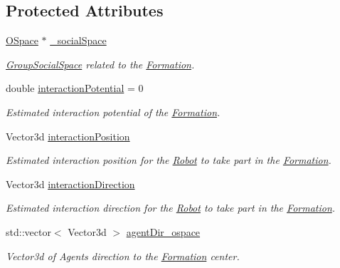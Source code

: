 \subsection*{Protected Attributes}
\begin{DoxyCompactItemize}
\item 
\hyperlink{classOSpace}{O\+Space} $\ast$ \hyperlink{classFormation_a8d69dd518359bf8d1d1b30a5c07db561}{\+\_\+social\+Space}\hypertarget{classFormation_a8d69dd518359bf8d1d1b30a5c07db561}{}\label{classFormation_a8d69dd518359bf8d1d1b30a5c07db561}

\begin{DoxyCompactList}\small\item\em \hyperlink{classGroupSocialSpace}{Group\+Social\+Space} related to the \hyperlink{classFormation}{Formation}. \end{DoxyCompactList}\item 
double \hyperlink{classFormation_afac1af6d51a6b8a910df4574cb7a6931}{interaction\+Potential} = 0\hypertarget{classFormation_afac1af6d51a6b8a910df4574cb7a6931}{}\label{classFormation_afac1af6d51a6b8a910df4574cb7a6931}

\begin{DoxyCompactList}\small\item\em Estimated interaction potential of the \hyperlink{classFormation}{Formation}. \end{DoxyCompactList}\item 
Vector3d \hyperlink{classFormation_a5e33d98c2b9ec916e601ae27d6c7f2ef}{interaction\+Position}\hypertarget{classFormation_a5e33d98c2b9ec916e601ae27d6c7f2ef}{}\label{classFormation_a5e33d98c2b9ec916e601ae27d6c7f2ef}

\begin{DoxyCompactList}\small\item\em Estimated interaction position for the \hyperlink{classRobot}{Robot} to take part in the \hyperlink{classFormation}{Formation}. \end{DoxyCompactList}\item 
Vector3d \hyperlink{classFormation_aa68570fc8c85c172fadaf93d30367371}{interaction\+Direction}\hypertarget{classFormation_aa68570fc8c85c172fadaf93d30367371}{}\label{classFormation_aa68570fc8c85c172fadaf93d30367371}

\begin{DoxyCompactList}\small\item\em Estimated interaction direction for the \hyperlink{classRobot}{Robot} to take part in the \hyperlink{classFormation}{Formation}. \end{DoxyCompactList}\item 
std\+::vector$<$ Vector3d $>$ \hyperlink{classFormation_a666d230b80d3d019b60beb287770be26}{agent\+Dir\+\_\+ospace}\hypertarget{classFormation_a666d230b80d3d019b60beb287770be26}{}\label{classFormation_a666d230b80d3d019b60beb287770be26}

\begin{DoxyCompactList}\small\item\em Vector3d of Agents direction to the \hyperlink{classFormation}{Formation} center. \end{DoxyCompactList}\end{DoxyCompactItemize}


